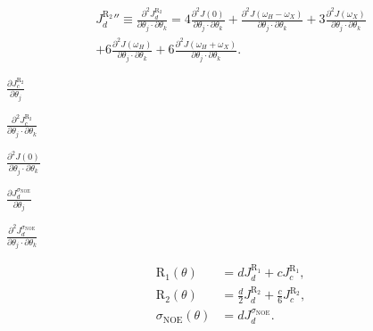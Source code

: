 \documentclass[a4paper,11pt,twoside,openright]{book}
\def\lthtmlcheckvsize{\ifdim\ht\sizebox<\vsize 
  \ifdim\wd\sizebox<\hsize\expandafter\hfill\fi \expandafter\vfill
  \else\expandafter\vss\fi}%
\begin{document}
{\newpage\clearpage
{}%
\begin{multline}
    {J_d^{\mathrm{R}_2}}'' \equiv \frac{\partial^2 J_d^{\mathrm{R}_2}}{\partial \theta_j \cdot \partial \theta_k}
        = 4 \frac{\partial^2 J(0)}{\partial \theta_j \cdot \partial \theta_k}
        + \frac{\partial^2 J(\omega_H - \omega_X)}{\partial \theta_j \cdot \partial \theta_k}
        + 3 \frac{\partial^2 J(\omega_X)}{\partial \theta_j \cdot \partial \theta_k} \\
        + 6 \frac{\partial^2 J(\omega_H)}{\partial \theta_j \cdot \partial \theta_k}
        + 6 \frac{\partial^2 J(\omega_H + \omega_X)}{\partial \theta_j \cdot \partial \theta_k}.
\end{multline}%
\lthtmldisplayZ
\lthtmlcheckvsize\clearpage}

{\newpage\clearpage
{}%
$\displaystyle {\frac{{\partial J_c^{\mathrm{R}_2}}}{{\partial \theta_j}}}$%
\lthtmlindisplaymathZ
\lthtmlcheckvsize\clearpage}

{\newpage\clearpage
{}%
$\displaystyle {\frac{{\partial^2 J_c^{\mathrm{R}_2}}}{{\partial \theta_j \cdot \partial \theta_k}}}$%
\lthtmlindisplaymathZ
\lthtmlcheckvsize\clearpage}

{\newpage\clearpage
{}%
$\displaystyle {\frac{{\partial^2 J(0)}}{{\partial \theta_j \cdot \partial \theta_k}}}$%
\lthtmlindisplaymathZ
\lthtmlcheckvsize\clearpage}

{\newpage\clearpage
{}%
$\displaystyle {\frac{{\partial J_d^{\sigma_{\scriptscriptstyle \mathrm{NOE}}}}}{{\partial \theta_j}}}$%
\lthtmlindisplaymathZ
\lthtmlcheckvsize\clearpage}

{\newpage\clearpage
{}%
$\displaystyle {\frac{{\partial^2 J_d^{\sigma_{\scriptscriptstyle \mathrm{NOE}}}}}{{\partial \theta_j \cdot \partial \theta_k}}}$%
\lthtmlindisplaymathZ
\lthtmlcheckvsize\clearpage}

{\newpage\clearpage
\setcounter{equation}{41}
%
\begin{subequations}\begin{align}
\mathrm{R}_1(\theta) & = d J_d^{\mathrm{R}_1} + c J_c^{\mathrm{R}_1},\\
\mathrm{R}_2(\theta) & = \frac{d}{2} J_d^{\mathrm{R}_2} + \frac{c}{6} J_c^{\mathrm{R}_2},\\
\sigma_{\scriptscriptstyle \mathrm{NOE}}(\theta) & = d J_d^{\sigma_{\scriptscriptstyle \mathrm{NOE}}}.\end{align}\end{subequations}%
\lthtmldisplayZ
\lthtmlcheckvsize\clearpage}
\end{document}
